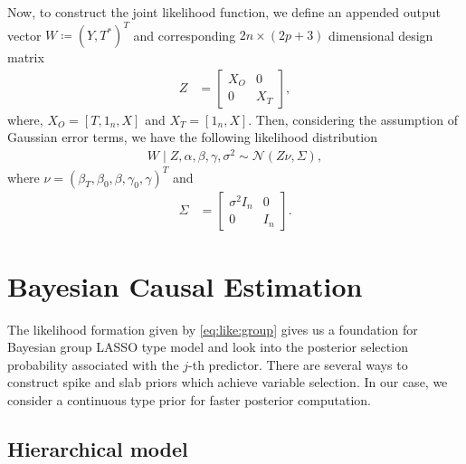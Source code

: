 \documentclass[oribibl]{llncs}
\newcommand{\normal}{\mathcal{N}}
\begin{document}
Now, to construct the joint likelihood function, we define an appended
output vector $W\coloneqq(Y, T^*)^T$ and corresponding $2n\times(2p+3)$ dimensional design matrix
\begin{align}
	Z &=
	\begin{bmatrix}
		X_O & 0 \\
		0 & X_T
	\end{bmatrix},
\end{align}
where, $X_O = [T, 1_n, X]$ and $X_T = [1_n, X]$. Then, considering the assumption of
Gaussian error terms, we have the following likelihood distribution
\begin{align}
	W\mid Z, \alpha, \beta, \gamma, \sigma^2 \sim\normal\left(Z\nu, \Sigma\right)\label{eq:like:group},
\end{align}
where $\nu = (\beta_T, \beta_0, \beta, \gamma_0, \gamma)^T$ and
\begin{align}
	\Sigma &=
	\begin{bmatrix}
		\sigma^2{I}_n & 0 \\
		0 & {I}_n
	\end{bmatrix}.
\end{align}


\section{Bayesian Causal Estimation}\label{sec:bayes}

The likelihood formation given by \cref{eq:like:group} gives us
a foundation for Bayesian group LASSO 
\cite{xu2015} type model and look into the posterior selection
probability associated with the $j$-th predictor. There are several
ways to construct spike and slab priors which achieve 
variable selection. In our case, we consider a continuous type
\cite{ishwaran2005} prior for faster posterior
computation.


\subsection{Hierarchical model}
\end{document}

